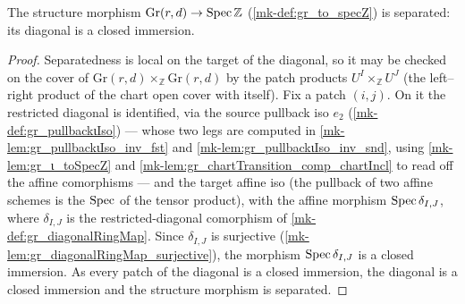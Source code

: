 \begin{lemma}\label{mk-lem:gr_separated_toSpecZ}
  \leanok

  The structure morphism \(\mathrm{Gr}(r,d) \to \operatorname{Spec} \mathbb{Z}\)
  (\ref{mk-def:gr_to_specZ}) is separated: its diagonal is a closed immersion.
\end{lemma}
\begin{proof}
  \leanok
    Separatedness is local on the target of the diagonal, so it may be checked on
  the cover of \(\mathrm{Gr}(r,d) \times_{\mathbb{Z}} \mathrm{Gr}(r,d)\) by the
  patch products \(U^I \times_{\mathbb{Z}} U^J\) (the left--right product of the
  chart open cover with itself). Fix a patch \((i,j)\). On it the restricted
  diagonal is identified, via the source pullback iso \(e_2\)
  (\ref{mk-def:gr_pullbackιIso}) — whose two legs are computed in
  \ref{mk-lem:gr_pullbackιIso_inv_fst} and \ref{mk-lem:gr_pullbackιIso_inv_snd},
  using \ref{mk-lem:gr_ι_toSpecZ} and \ref{mk-lem:gr_chartTransition_comp_chartIncl}
  to read off the affine comorphisms — and the target affine iso (the pullback of
  two affine schemes is the \(\operatorname{Spec}\) of the tensor product), with the affine
  morphism \(\operatorname{Spec} \delta_{I,J}\), where \(\delta_{I,J}\) is the
  restricted-diagonal comorphism of \ref{mk-def:gr_diagonalRingMap}. Since
  \(\delta_{I,J}\) is surjective (\ref{mk-lem:gr_diagonalRingMap_surjective}), the
  morphism \(\operatorname{Spec} \delta_{I,J}\) is a closed immersion. As every patch of the
  diagonal is a closed immersion, the diagonal is a closed immersion and the
  structure morphism is separated.
\end{proof}

